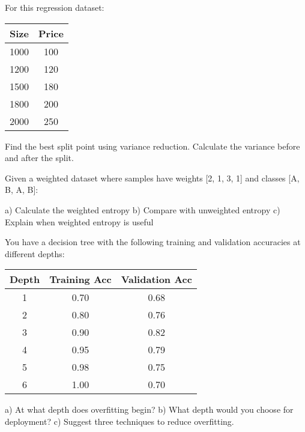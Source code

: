 \documentclass{article}
\newcounter{exercise}
\begin{document}
\begin{tcolorbox}[colback=gray!5!white,colframe=gray!75!black,title=Problem \stepcounter{exercise}: Regression Tree]

For this regression dataset:
\begin{center}
\begin{tabular}{|c|c|}
\hline
\textbf{Size} & \textbf{Price} \\
\hline
1000 & 100 \\
1200 & 120 \\
1500 & 180 \\
1800 & 200 \\
2000 & 250 \\
\hline
\end{tabular}
\end{center}

Find the best split point using variance reduction. Calculate the variance before and after the split.
\end{tcolorbox}

\begin{tcolorbox}[colback=gray!5!white,colframe=gray!75!black,title=Problem \stepcounter{exercise}: Weighted Entropy]

Given a weighted dataset where samples have weights [2, 1, 3, 1] and classes [A, B, A, B]:

a) Calculate the weighted entropy
b) Compare with unweighted entropy
c) Explain when weighted entropy is useful
\end{tcolorbox}

\begin{tcolorbox}[colback=gray!5!white,colframe=gray!75!black,title=Problem \stepcounter{exercise}: Overfitting Analysis]

You have a decision tree with the following training and validation accuracies at different depths:

\begin{center}
\begin{tabular}{|c|c|c|}
\hline
\textbf{Depth} & \textbf{Training Acc} & \textbf{Validation Acc} \\
\hline
1 & 0.70 & 0.68 \\
2 & 0.80 & 0.76 \\
3 & 0.90 & 0.82 \\
4 & 0.95 & 0.79 \\
5 & 0.98 & 0.75 \\
6 & 1.00 & 0.70 \\
\hline
\end{tabular}
\end{center}

a) At what depth does overfitting begin?
b) What depth would you choose for deployment?
c) Suggest three techniques to reduce overfitting.
\end{tcolorbox}
\end{document}
